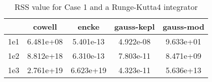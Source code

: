 \begin{table}
\centering
\begin{tabular}{|c|c|c|c|c|}
\hline
 & cowell & encke & gauss-kepl & gauss-mod \\
\hline
1e1 & 6.481e+08 & 5.401e-13 & 4.922e-08 & 9.633e+01 \\
\hline
1e2 & 8.812e+18 & 6.310e-13 & 7.803e-11 & 8.471e+09 \\
\hline
1e3 & 2.761e+19 & 6.623e+19 & 4.323e-11 & 5.636e+13 \\
\hline
\end{tabular}
\caption{RSS value for Case 1 and a Runge-Kutta4 integrator}
\label{table:tab:keplerapprox_rss_C1_Runge-Kutta4}
\end{table}
